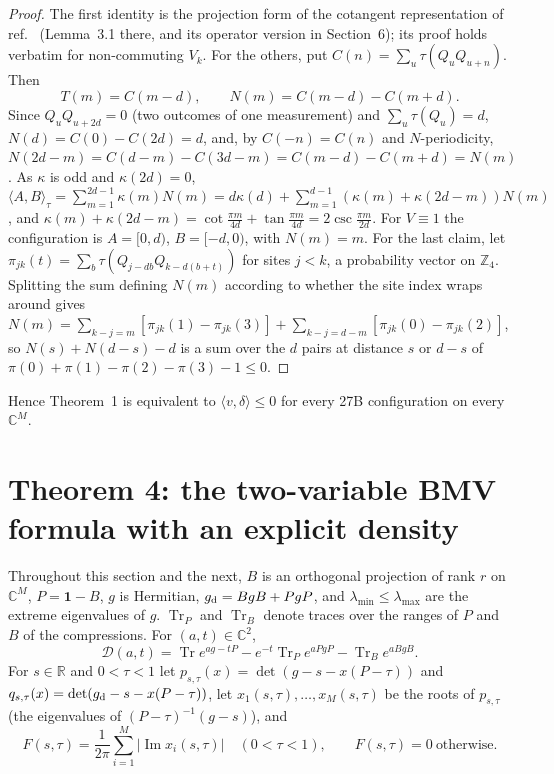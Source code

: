 \documentclass[11pt]{amsart}
\theoremstyle{definition}
\theoremstyle{remark}
\numberwithin{equation}{section}
\newcommand{\R}{\mathbb{R}}
\newcommand{\C}{\mathbb{C}}
\newcommand{\Z}{\mathbb{Z}}
\newcommand{\Tr}{\operatorname{Tr}}
\newcommand{\one}{\mathbf{1}}
\newcommand{\cD}{\mathcal{D}}
\renewcommand{\Im}{\operatorname{Im}}
\begin{document}
\begin{proof}
The first identity is the projection form of the cotangent representation of ref.~\cite{classical} (Lemma~3.1
there, and its operator version in Section~6); its proof holds verbatim for non-commuting $V_k$. For the others, put
$C(n)=\sum_u\tau(Q_uQ_{u+n})$. Then
\[
T(m)=C(m-d),\qquad N(m)=C(m-d)-C(m+d).
\]
Since
$Q_uQ_{u+2d}=0$ (two outcomes of one measurement) and $\sum_u\tau(Q_u)=d$, $N(d)=C(0)-C(2d)=d$, and, by $C(-n)=C(n)$
and $N$-periodicity, $N(2d-m)=C(d-m)-C(3d-m)=C(m-d)-C(m+d)=N(m)$. As $\kappa$ is odd and
$\kappa(2d)=0$, $\langle A,B\rangle_\tau=\sum_{m=1}^{2d-1}\kappa(m)N(m)=d\kappa(d)+\sum_{m=1}^{d-1}(\kappa(m)+\kappa(2d-m))N(m)$,
and $\kappa(m)+\kappa(2d-m)=\cot\frac{\pi m}{4d}+\tan\frac{\pi m}{4d}=2\csc\frac{\pi m}{2d}$. For $V\equiv1$ the
configuration is $A=[0,d)$, $B=[-d,0)$, with $N(m)=m$. For the last claim, let $\pi_{jk}(t)=\sum_b\tau(Q_{j-db}Q_{k-d(b+t)})$
for sites $j<k$, a probability vector on $\Z_4$. Splitting the sum defining $N(m)$ according to whether the site index
wraps around gives $N(m)=\sum_{k-j=m}[\pi_{jk}(1)-\pi_{jk}(3)]+\sum_{k-j=d-m}[\pi_{jk}(0)-\pi_{jk}(2)]$, so
$N(s)+N(d-s)-d$ is a sum over the $d$ pairs at distance $s$ or $d-s$ of $\pi(0)+\pi(1)-\pi(2)-\pi(3)-1\le0$.
\end{proof}

Hence Theorem~1 is equivalent to $\langle v,\delta\rangle\le0$ for every 27B configuration on every $\C^M$.

\section{Theorem 4: the two-variable BMV formula with an explicit density}\label{sec:bmv}

Throughout this section and the next, $B$ is an orthogonal projection of rank $r$ on $\C^M$, $P=\one-B$, $g$ is
Hermitian, $g_{\rm d}=BgB+PgP$, and $\lambda_{\min}\le\lambda_{\max}$ are the extreme eigenvalues of $g$. $\Tr_P$ and
$\Tr_B$ denote traces over the ranges of $P$ and $B$ of the compressions. For $(a,t)\in\C^2$,
\[
\cD(a,t)=\Tr e^{ag-tP}-e^{-t}\Tr_Pe^{aPgP}-\Tr_Be^{aBgB}.
\]
For $s\in\R$ and $0<\tau<1$ let $p_{s,\tau}(x)=\det(g-s-x(P-\tau))$ and $q_{s,\tau}(x)=\det(g_{\rm d}-s-x(P-\tau))$, let
$x_1(s,\tau),\dots,x_M(s,\tau)$ be the roots of $p_{s,\tau}$ (the eigenvalues of $(P-\tau)^{-1}(g-s)$), and
\[
F(s,\tau)=\frac{1}{2\pi}\sum_{i=1}^M|\Im x_i(s,\tau)|\quad(0<\tau<1),\qquad F(s,\tau)=0\ \text{otherwise}.
\]
\end{document}
